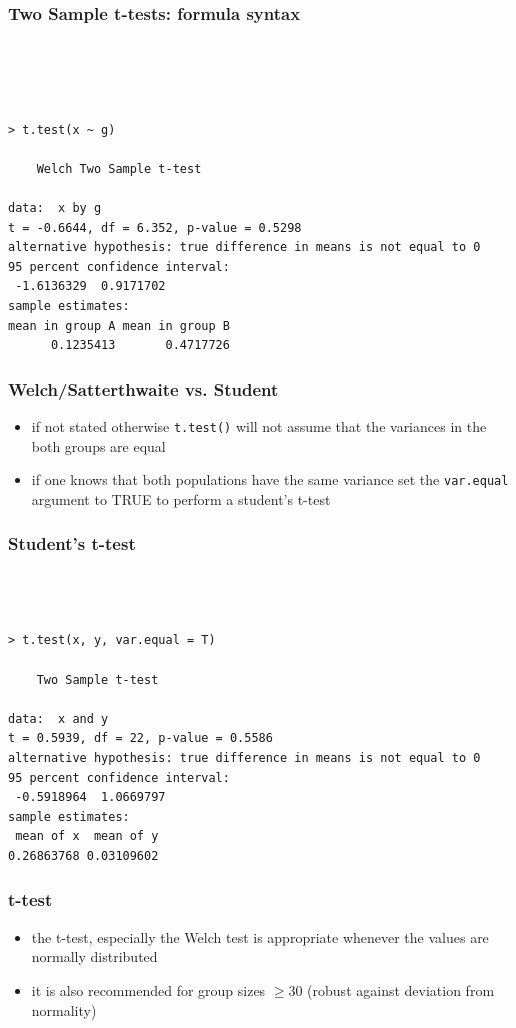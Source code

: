 \documentclass[xcolor={table}]{beamer}
\begin{document}
\begin{frame}[fragile]\frametitle{Two Sample t-tests: formula syntax}\footnotesize
\begin{verbatim}




> t.test(x ~ g)

	Welch Two Sample t-test

data:  x by g
t = -0.6644, df = 6.352, p-value = 0.5298
alternative hypothesis: true difference in means is not equal to 0
95 percent confidence interval:
 -1.6136329  0.9171702
sample estimates:
mean in group A mean in group B 
      0.1235413       0.4717726 
\end{verbatim}
\end{frame}


\begin{frame}[fragile]\frametitle{Welch/Satterthwaite vs. Student}
  \begin{itemize}
  \item if not stated otherwise \texttt{t.test()} will not assume that the variances in the both groups are equal
  \item if one knows that both populations have the same variance set the \texttt{var.equal} argument to TRUE to perform a student's t-test
  \end{itemize}
\end{frame}

\begin{frame}[fragile]\frametitle{Student's t-test}
\begin{verbatim}



> t.test(x, y, var.equal = T)

	Two Sample t-test

data:  x and y
t = 0.5939, df = 22, p-value = 0.5586
alternative hypothesis: true difference in means is not equal to 0
95 percent confidence interval:
 -0.5918964  1.0669797
sample estimates:
 mean of x  mean of y 
0.26863768 0.03109602   
\end{verbatim}
\end{frame}

\begin{frame}[fragile]\frametitle{t-test}
  \begin{itemize}
  \item the t-test, especially the Welch test is appropriate whenever the values are normally distributed
  \item it is also recommended for group sizes $\geq 30$ (robust against deviation from normality)
  \end{itemize}
\end{frame}
\end{document}
